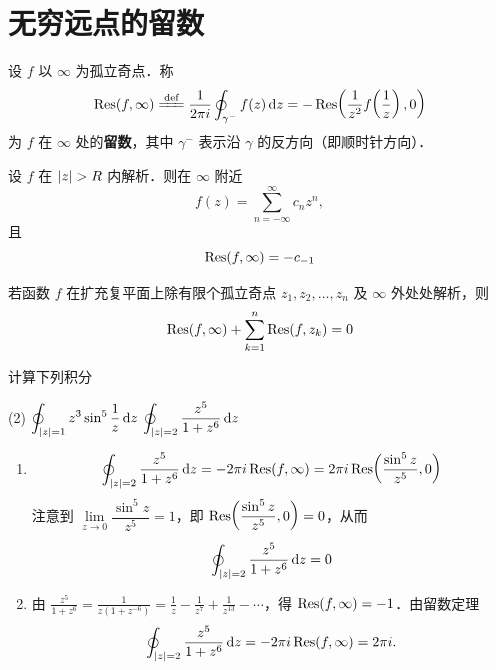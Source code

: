 \documentclass[12pt, a4paper, oneside, UTF8]{ctexbook}
\begin{document}
\section{无穷远点的留数}

\begin{definition}[无穷远点留数]
设 $f$ 以 $\infty$ 为孤立奇点．称
\[
\Res(f,\infty) \defeq \frac{1}{2\pi i}\oint_{\gamma^-} f(z)\,\d z = -\Res\!\left(\frac{1}{z^2}f\!\left(\frac{1}{z}\right),0\right)
\]
为 $f$ 在 $\infty$ 处的\textbf{留数}，其中 $\gamma^-$ 表示沿 $\gamma$ 的反方向（即顺时针方向）．
\end{definition}

\begin{theorem}
设 $f$ 在 $\abs{z}>R$ 内解析．则在 $\infty$ 附近
\[
f(z) = \sum_{n=-\infty}^{\infty} c_n z^n,
\]
且
\[
\Res(f,\infty) = -c_{-1}
\]
\end{theorem}

\begin{theorem}[与有限点留数的关系]
    若函数 $f$ 在扩充复平面上除有限个孤立奇点 $z_1,z_2,\dots,z_n$ 及 $\infty$ 外处处解析，则
    \[\Res(f,\infty) + \sum_{k=1}^{n}\Res(f,z_k) = 0\]
\end{theorem}

\begin{example}
    计算下列积分
    \begin{tasks}[label=(\arabic*)](2)
        \task $\displaystyle\oint_{\abs{z}=1}z^3\sin^5\frac{1}{z}\,\mathrm{d} z$
        \task $\displaystyle\oint_{\abs{z}=2}\frac{z^5}{1+z^6}\,\mathrm{d} z$
    \end{tasks}
\end{example}
\begin{solution}
    \begin{enumerate}
        \item 
        \[
            \oint_{\abs{z}=2}\frac{z^5}{1+z^6}\,\d z = -2\pi i \Res(f,\infty) = 2\pi i \Res\!\left(\frac{\sin^5z}{z^5},0\right)
        \]
        注意到 $\lim\limits_{z\to 0}\dfrac{\sin^5 z}{z^5} = 1$，即 $\Res\!\left(\dfrac{\sin^5 z}{z^5},0\right) = 0$，从而
        \[\oint_{\abs{z}=2}\frac{z^5}{1+z^6}\,\mathrm{d} z = 0\]
        \item 由 $\displaystyle\frac{z^5}{1+z^6} = \frac{1}{z(1+z^{-6})} = \frac{1}{z}-\frac{1}{z^7}+\frac{1}{z^{13}}-\cdots$，得 $\Res(f,\infty)=-1$．由留数定理
            \[
            \oint_{\abs{z}=2}\frac{z^5}{1+z^6}\,\d z = -2\pi i \Res(f,\infty) = 2\pi i.
            \]
    \end{enumerate}
    
\end{solution}
\end{document}
